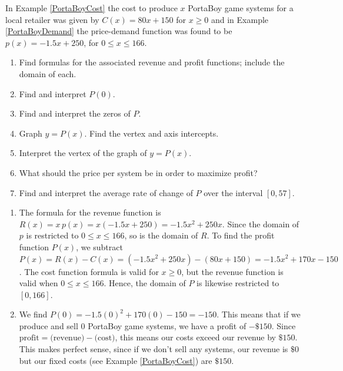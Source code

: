 \documentclass{ximera}
\begin{document}
\begin{example}  \label{PortaBoyProfit}  In Example \ref{PortaBoyCost} the cost to produce $x$ PortaBoy game systems for a local retailer was given by $C(x) = 80x + 150$ for $x \geq 0$ and in Example \ref{PortaBoyDemand} the price-demand function was found to be $p(x) = -1.5x+250$, for $0 \leq x \leq 166$.

\begin{enumerate}

\item  Find formulas for the associated revenue and profit functions;   include the domain of each.

\item Find and interpret $P(0)$.

\item  Find and interpret the zeros of $P$.

\item  Graph $y = P(x)$. Find the vertex and axis intercepts.

\item  Interpret the vertex of the graph of $y = P(x)$.

\item What should the price per system be in order to maximize profit?

\item Find and interpret the average rate of change of $P$ over the interval $[0, 57]$.

\end{enumerate}

\begin{explanation}

\begin{enumerate}

\item  The formula for the revenue function is $R(x) = x \, p(x) = x(-1.5x+250) = -1.5x^2 + 250x$. Since the domain of $p$ is restricted to  $0 \leq x \leq 166$, so is the domain of $R$.    To find the profit function $P(x)$, we subtract $P(x) = R(x) - C(x) = \left(-1.5x^2+250x\right) - \left(80x + 150\right) = -1.5x^2+170x-150$.    The cost function formula is valid for $x \geq 0$, but the revenue function is valid when $0 \leq x \leq 166$.  Hence, the domain of $P$ is likewise restricted to $[0, 166]$. 

\item We find $P(0) = -1.5(0)^2+170(0) - 150 = -150$.  This means that if we produce and sell $0$ PortaBoy game systems, we have a profit of $- \$ 150$.  Since $\text{profit} = \text{(revenue)} - \text{(cost)}$, this means our costs exceed our revenue by $\$150$. This makes perfect sense, since if we don't sell any systems, our revenue is $\$0$ but our fixed costs (see Example  \ref{PortaBoyCost}) are $\$150$.


\end{enumerate}
\end{explanation}
\end{example}
\end{document}
